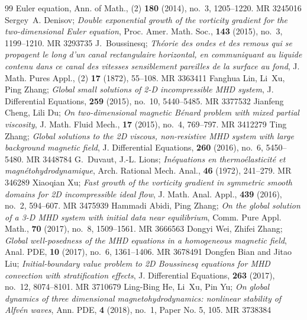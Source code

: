 \documentclass[10pt,a4paper]{amsart}
\numberwithin{equation}{section}
\begin{document}
\begin{thebibliography}{99}
{{E}uler equation}, Ann. of  Math., (2) \textbf{180} (2014), no.~3, 1205--1220. MR {3245016}
Sergey~A. Denisov; 
\emph{Double exponential growth of the vorticity gradient
 for the two-dimensional {E}uler equation}, Proc. Amer. Math. Soc.,
 \textbf{143} (2015), no.~3, 1199--1210. MR {3293735}
J.~Boussinesq; 
\emph{Th\'eorie des ondes et des remous qui se propagent le
 long d'un canal rectangulaire horizontal, en communiquant au liquide contenu
 dans ce canal des vitesses sensiblement pareilles de la surface au fond}, J.
 Math. Pures Appl., (2) \textbf{17} (1872), 55--108. MR {3363411}
Fanghua Lin, Li~Xu, Ping Zhang; 
\emph{Global small solutions of 2-{D}
 incompressible {MHD} system}, J. Differential Equations, \textbf{259} (2015),
 no.~10, 5440--5485. MR {3377532}
Jianfeng Cheng, Lili Du; 
\emph{On two-dimensional magnetic {B}\'enard
 problem with mixed partial viscosity}, J. Math. Fluid Mech., \textbf{17}
 (2015), no.~4, 769--797. MR {3412279}
Ting Zhang; 
\emph{Global solutions to the 2{D} viscous, non-resistive {MHD}
system with large background magnetic field}, J. Differential Equations,
\textbf{260} (2016), no.~6, 5450--5480. MR {3448784}
G.~Duvaut, J.-L. Lions; 
\emph{In\'equations en thermo\'elasticit\'e et
 magn\'etohydrodynamique}, Arch. Rational Mech. Anal., \textbf{46} (1972),
 241--279. MR {346289}
Xiaoqian Xu; 
\emph{Fast growth of the vorticity gradient in symmetric smooth
 domains for 2{D} incompressible ideal flow}, J. Math. Anal. Appl.,
 \textbf{439} (2016), no.~2, 594--607. MR {3475939}
Hammadi Abidi, Ping Zhang; 
\emph{On the global solution of a 3-{D} {MHD}
 system with initial data near equilibrium}, Comm. Pure Appl. Math.,
 \textbf{70} (2017), no.~8, 1509--1561. MR {3666563}
Dongyi Wei, Zhifei Zhang; 
\emph{Global well-posedness of the {MHD} equations
 in a homogeneous magnetic field}, Anal. PDE, \textbf{10} (2017), no.~6,
 1361--1406. MR {3678491}
Dongfen Bian and Jitao Liu; 
\emph{Initial-boundary value problem to 2{D}
 {B}oussinesq equations for {MHD} convection with stratification effects}, J.
 Differential Equations, \textbf{263} (2017), no.~12, 8074--8101. MR {3710679}
Ling-Bing He, Li~Xu, Pin Yu; 
\emph{On global dynamics of three dimensional
 magnetohydrodynamics: nonlinear stability of {A}lfv\'en waves}, Ann. PDE,
 \textbf{4} (2018), no.~1, Paper No. 5, 105. MR {3738384}

\end{thebibliography}
\end{document}
